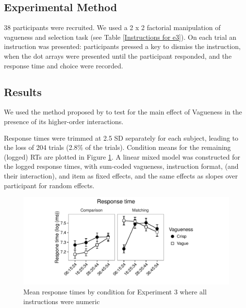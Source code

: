 \subsection{Experimental Method} %

38 participants were recruited. We used a 2 x 2 factorial manipulation of vagueness and selection task (see Table \ref{Instructions for e3}).
On each trial an instruction was presented: participants pressed a key to dismiss the instruction, when the dot arrays were presented until the participant responded, and the response time and choice were recorded.

\subsection{Results} %

We used the method proposed by \citet{Levy:MainEffectsInteractions} to test for the main effect of Vagueness in the presence of its higher-order interactions.

Response times were trimmed at 2.5 SD separately for each subject, leading to the loss of 204 trials (2.8\% of the trials).
Condition means for the remaining (logged) RTs are plotted in Figure \ref{resultse3}.
A linear mixed model was constructed for the logged response times, 
with sum-coded vagueness, instruction format, (and their interaction), and item as fixed effects, and the same effects as slopes over participant for random effects.

\begin{figure}[htbp]
\centering
\includegraphics[width=\textwidth]{figures/e3-rtplot-1.pdf}
\caption{Mean response times by condition for Experiment 3 where all instructions were numeric}
\label{resultse3}
\end{figure}

